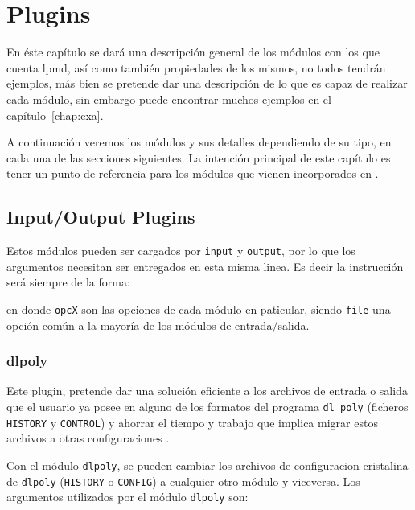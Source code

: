 \chapter{Plugins}
\label{chap:modulos}

En \'este cap\'itulo se dar\'a una descripci\'on general de los m\'odulos con
los que cuenta lpmd, as\'i como tambi\'en propiedades de los mismos, no todos
tendr\'an ejemplos, m\'as bien se pretende dar una descripci\'on de lo que es
capaz de realizar cada m\'odulo, sin embargo puede encontrar muchos ejemplos en
el cap\'itulo~\ref{chap:exa}.


A continuaci\'on veremos los m\'odulos y sus detalles dependiendo de su tipo, en
cada una de las secciones siguientes. La intenci\'on principal de este
cap\'itulo es tener un punto de referencia para los m\'odulos que vienen
incorporados en {\lpmd}.

\section{Input/Output Plugins}
\label{chap:modulos:entradasalida}

Estos m\'odulos pueden ser cargados por \verb|input| y \verb|output|, por lo que
los argumentos necesitan ser entregados en esta misma linea. Es decir la
instrucci\'on ser\'a siempre de la forma:



en donde \verb|opcX| son las opciones de cada m\'odulo en paticular, siendo
\verb|file| una opci\'on com\'un a la mayor\'ia de los m\'odulos de
entrada/salida.

\subsection{dlpoly}

Este plugin, pretende dar una soluci\'on eficiente a los archivos de entrada o
salida que el usuario ya posee en alguno de los formatos del programa
\verb|dl_poly| (ficheros \verb|HISTORY| y \verb|CONTROL|) y ahorrar el tiempo y
trabajo que implica migrar estos archivos a otras configuraciones .


Con el m\'odulo \verb|dlpoly|, se pueden cambiar los archivos de configuracion
cristalina de \verb|dlpoly| (\verb|HISTORY| o \verb|CONFIG|) a cualquier otro
m\'odulo y viceversa. Los argumentos utilizados por el m\'odulo \verb|dlpoly|
son:

